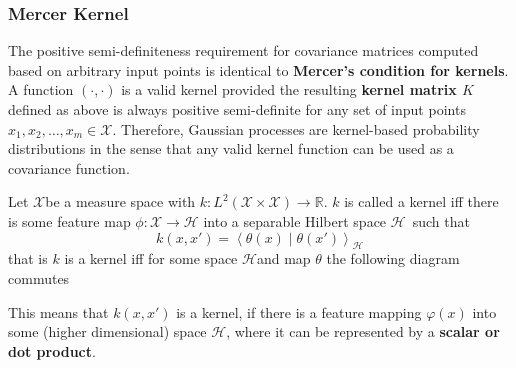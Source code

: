 \documentclass[11pt]{article}
\theoremstyle{definition}
\newcommand*\R{\mathbb{R}}
\newcommand*\X{\ensuremath{\mathcal{X}}}
\newcommand*\Hilbert{\ensuremath{\mathcal{H}}}
\begin{document}
\subsubsection{Mercer Kernel}
The positive semi-definiteness requirement for covariance matrices computed based on arbitrary input points is identical to \textbf{Mercer's condition for kernels}. A function $(\cdot,\cdot)$ is a valid kernel provided the resulting \textbf{kernel matrix $K$} defined as above is always positive semi-definite for any set of input points $x_1, x_2, \dots, x_m \in \X$. Therefore, Gaussian processes are kernel-based probability distributions in the sense that any valid kernel function can be used as a covariance function.
\begin{definition}
	Let \X be a measure space with $k: L^2(\X\times\X)\rightarrow \R$. $k$ is called a kernel iff there is some feature map $\phi: \X \rightarrow \Hilbert$ into a separable Hilbert space \Hilbert\ such that
	\begin{equation*}
		k(x,x') = \left\langle \theta(x) \middle| \theta(x') \right\rangle_{\Hilbert}
	\end{equation*}
	that is $k$ is a kernel iff for some space \Hilbert and map $\theta$ the following diagram commutes
	\begin{center}
	\end{center}
	This means that $k(x,x')$ is a kernel, if there is a feature mapping $\varphi(x)$ into some (higher dimensional) space \Hilbert, where it can be represented by a \textbf{scalar or dot product}.
\end{definition}
\end{document}
